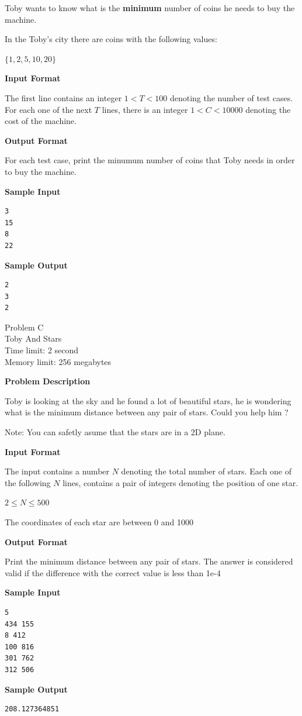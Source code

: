 \documentclass[11pt]{article}
\begin{document}
Toby wants to know what is the \textbf{minimum} number of coins he needs to buy the machine.

In the Toby's city there are coins with the following values:

$\{1, 2, 5, 10, 20\}$


\textbf{\large Input Format}

The first line contains an integer $1 < T < 100$ denoting the number of test cases. For each
one of the next $T$ lines, there is an integer $1 < C < 10000$ denoting the cost of the machine.

\textbf{\large Output Format}

For each test case, print the minumum number of coins that Toby needs in order
to buy the machine.

\textbf{\large Sample Input}

\begin{verbatim}
3
15
8
22
\end{verbatim}

\textbf{\large Sample Output}

\begin{verbatim}
2
3
2
\end{verbatim}

\newpage
        \begin{center}
            {\LARGE Problem C}\\
            {\Large Toby And Stars}\\
            {Time limit: 2 second}\\
            {Memory limit: 256 megabytes}
        \end{center}\textbf{\large Problem Description}

Toby is looking at the sky and he found a lot of beautiful stars, he is
wondering what is the minimum distance between any pair of stars. Could you
help him ?

Note: You can safetly asume that the stars are in a 2D plane.

\textbf{\large Input Format}

The input contains a number $N$ denoting the total number of stars. Each one of
the following $N$ lines, contains a pair of integers denoting the position of
one star.

$2 \le N \le 500$

The coordinates of each star are between 0 and 1000

\textbf{\large Output Format}

Print the minimum distance between any pair of stars. The answer is considered
valid if the difference with the correct value is less than 1e-4

\textbf{\large Sample Input}

\begin{verbatim}
5
434 155
8 412
100 816
301 762
312 506
\end{verbatim}

\textbf{\large Sample Output}

\begin{verbatim}
208.127364851
\end{verbatim}

\newpage
    
\end{document}
